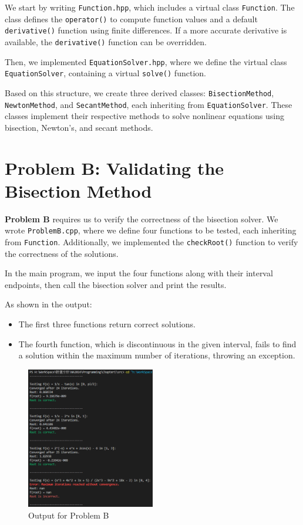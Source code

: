 \documentclass[a4paper]{article}
\begin{document}
We start by writing \texttt{Function.hpp}, which includes a virtual class \texttt{Function}. The class defines the \texttt{operator()} to compute function values and a default \texttt{derivative()} function using finite differences. If a more accurate derivative is available, the \texttt{derivative()} function can be overridden.

Then, we implemented \texttt{EquationSolver.hpp}, where we define the virtual class \texttt{EquationSolver}, containing a virtual \texttt{solve()} function.

Based on this structure, we create three derived classes: \texttt{BisectionMethod}, \texttt{NewtonMethod}, and \texttt{SecantMethod}, each inheriting from \texttt{EquationSolver}. These classes implement their respective methods to solve nonlinear equations using bisection, Newton's, and secant methods.

\section{Problem B: Validating the Bisection Method}

\textbf{Problem B} requires us to verify the correctness of the bisection solver. We wrote \texttt{ProblemB.cpp}, where we define four functions to be tested, each inheriting from \texttt{Function}. Additionally, we implemented the \texttt{checkRoot()} function to verify the correctness of the solutions. 

In the main program, we input the four functions along with their interval endpoints, then call the bisection solver and print the results. 

As shown in the output:
\begin{itemize}
    \item The first three functions return correct solutions.
    \item The fourth function, which is discontinuous in the given interval, fails to find a solution within the maximum number of iterations, throwing an exception.
\end{itemize}

\begin{figure}[H]  
  \centering
  \includegraphics[width=0.5\textwidth]{./picture/ProblemB.png}
  \caption{Output for Problem B}
\end{figure}
\end{document}
